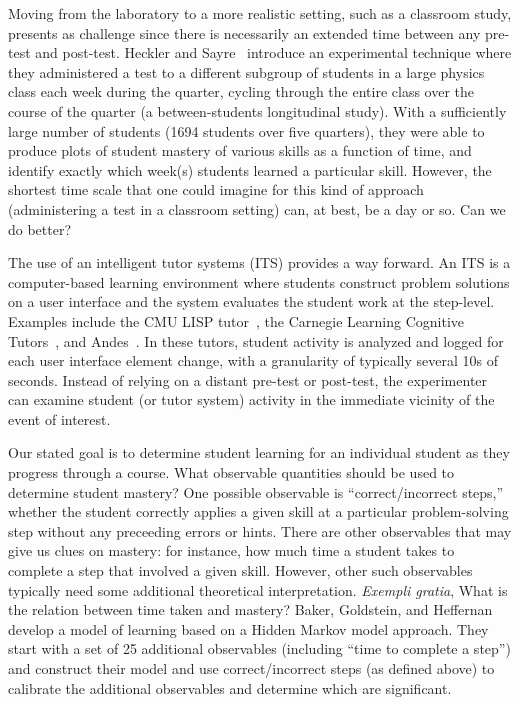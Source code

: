 \documentclass{acmlarge-edm}
\begin{document}
Moving from the laboratory to a more realistic setting, such as a
classroom study, presents as challenge since there is necessarily an
extended time between any pre-test and post-test.  Heckler and 
Sayre~\citeyear{heckler_what_2010} introduce an experimental technique
where they administered a test to a different subgroup of students in
a large physics class each week during the quarter, cycling through
the entire class over the course of the quarter (a
between-students longitudinal study).  With a sufficiently large number
of students (1694 students over five quarters), they were able to produce
plots of student mastery of various skills as a function of time, and
identify exactly which week(s) students learned a particular skill.
However, the shortest time scale that one could imagine for this
kind of approach (administering a test in a classroom setting) can, at
best, be a day or so.  Can we do better?

The use of an intelligent tutor systems (ITS) provides a way forward. 
An ITS is a computer-based learning environment where students
construct problem solutions on a user interface and the system
evaluates the student work at the step-level. 
Examples include the CMU LISP tutor~\cite{corbett_knowledge_1995}, the
Carnegie Learning Cognitive Tutors~\cite{koedinger_illustrating_1998},
and Andes~\cite{vanlehn_andes_2005}.  In these tutors, student
activity is analyzed and logged for each user interface element change, with a granularity
of typically several 10s of seconds.
Instead of relying on a distant pre-test or post-test, the experimenter can examine student
(or tutor system) activity in the immediate vicinity of the event of interest.

Our stated goal is to determine student learning for an individual
student as they progress through a course.  What observable quantities should be used to
determine student mastery?  One possible observable is ``correct/incorrect steps,''  whether 
the student correctly applies a given skill at a particular problem-solving step 
without any preceeding errors or hints.  There are other
observables that may give us clues on mastery: for instance, how much
time a student takes to complete a step that involved a given skill.  However, other such
observables typically need some additional theoretical interpretation. {\em Exempli gratia},
What is the relation between time taken and mastery?  Baker, Goldstein, and
Heffernan~\citeyear{baker_detecting_2011} develop a model of learning
based on a Hidden Markov model approach.  They start with a set of
25 additional observables (including ``time to
complete a step'') and construct their model and use correct/incorrect steps (as defined above)
to calibrate the additional observables and determine which are significant.
\end{document}
